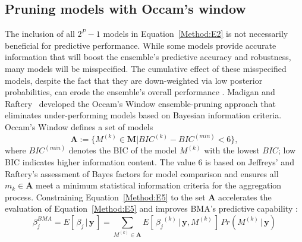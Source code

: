 \documentclass[journal=jpcbfk, manuscript=article]{achemso}
\newcommand{\+}[1]{\ensuremath{\mathbf{#1}}}
\begin{document}
\subsection{Pruning models with Occam's window} \label{Method:StatEnsemble}

The inclusion of all $2^P-1$ models in Equation~\ref{Method:E2} is not necessarily beneficial for predictive performance.
While some models provide accurate information that will boost the ensemble's predictive accuracy and robustness, many models will be misspecified.
The cumulative effect of these misspecified models, despite the fact that they are down-weighted via low posterior probabilities, can erode the ensemble's overall performance \cite{Qian:2015, Martinez-Munoz:2009, Raftery:1998, Onorante:2014, Madigan:1994, Hoeting:1999, Morales-Casique:2010}.
Madigan and Raftery~\cite{Madigan:1994} developed the Occam's Window ensemble-pruning approach that eliminates under-performing models based on Bayesian information criteria.
Occam's Window defines a set of models
\begin{equation} \label{Method:E5}
	\textbf{A} := \{M^{(k)} \in \textbf{M} | BIC^{(k)} - BIC^{(min)} < 6\},
\end{equation}
where $BIC^{(min)}$ denotes the BIC of the model $M^{(k)}$ with the lowest $BIC$; low BIC indicates higher information content.
The value 6 is based on Jeffreys' \cite{Jefferys:1961} and Raftery's \cite{Raftery:1995} assessment of Bayes factors for model comparison and ensures all $m_k \in \mathbf{A}$ meet a minimum statistical information criteria for the aggregation process.
Constraining Equation~\ref{Method:E5} to the set $\+A$ accelerates the evaluation of Equation~\ref{Method:E5} and improves BMA's predictive capability \cite{Raftery:1998, Madigan:1994}:
\begin{equation} \label{Method:E6}
	\beta^{BMA}_j =  E[\,\beta_j \,|\, \+y\,] = \sum_{M^{(k)}\in \mathbf{A}} E[\,{\beta_j}^{(k)} \,|\, \+y,M^{(k)}\,] \,Pr(M^{(k)} \,|\, \textbf{y})
\end{equation}
\end{document}
